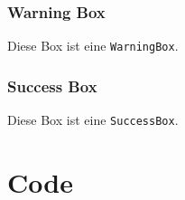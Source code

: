 \begin{InfoBox}
\begin{multicols}{2}
\begin{WarningBox}
				\subsubsection{Warning Box}
				Diese Box ist eine \texttt{WarningBox}.
			\end{WarningBox}
			\begin{SuccessBox}
				\subsubsection{Success Box}
				Diese Box ist eine \texttt{SuccessBox}.
			\end{SuccessBox}
		\end{multicols}
	\end{InfoBox}

	\pagebreak

	\section{Code}


